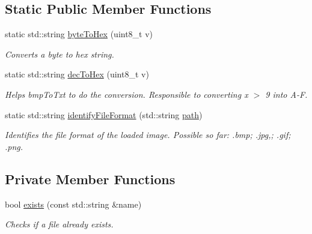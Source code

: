 \subsection*{Static Public Member Functions}
\begin{DoxyCompactItemize}
\item 
static std\+::string \mbox{\hyperlink{classImage_ac1c14eba8a20f8bb71c3c21eaba90ecb}{byte\+To\+Hex}} (uint8\+\_\+t v)
\begin{DoxyCompactList}\small\item\em Converts a byte to hex string. \end{DoxyCompactList}\item 
static std\+::string \mbox{\hyperlink{classImage_a26f7e0b2649e2529df7e7aea46f2da4a}{dec\+To\+Hex}} (uint8\+\_\+t v)
\begin{DoxyCompactList}\small\item\em Helps bmp\+To\+Txt to do the conversion. Responsible to converting x $>$ 9 into A-\/F. \end{DoxyCompactList}\item 
static std\+::string \mbox{\hyperlink{classImage_ac4e8db14cfd60a6a7085e6fcb83488a4}{identify\+File\+Format}} (std\+::string \mbox{\hyperlink{classImage_aec8a33f176362d146da8c058798ebbff}{path}})
\begin{DoxyCompactList}\small\item\em Identifies the file format of the loaded image. Possible so far\+: .bmp; .jpg,; .gif; .png. \end{DoxyCompactList}\end{DoxyCompactItemize}
\subsection*{Private Member Functions}
\begin{DoxyCompactItemize}
\item 
bool \mbox{\hyperlink{classImage_a83d7183bfcd632649c36504d9ab07e36}{exists}} (const std\+::string \&name)
\begin{DoxyCompactList}\small\item\em Checks if a file already exists. \end{DoxyCompactList}\end{DoxyCompactItemize}
